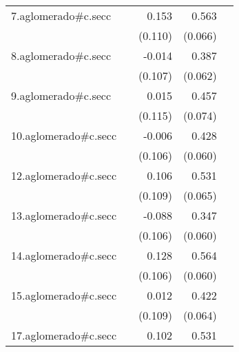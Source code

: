 {\begin{longtable}{l*{4}{D{.}{.}{-1}}}
\addlinespace
7.aglomerado#c.secc&                     &       0.153         &       0.563\sym{***}&                     \\
            &                     &     (0.110)         &     (0.066)         &                     \\
\addlinespace
8.aglomerado#c.secc&                     &      -0.014         &       0.387\sym{***}&                     \\
            &                     &     (0.107)         &     (0.062)         &                     \\
\addlinespace
9.aglomerado#c.secc&                     &       0.015         &       0.457\sym{***}&                     \\
            &                     &     (0.115)         &     (0.074)         &                     \\
\addlinespace
10.aglomerado#c.secc&                     &      -0.006         &       0.428\sym{***}&                     \\
            &                     &     (0.106)         &     (0.060)         &                     \\
\addlinespace
12.aglomerado#c.secc&                     &       0.106         &       0.531\sym{***}&                     \\
            &                     &     (0.109)         &     (0.065)         &                     \\
\addlinespace
13.aglomerado#c.secc&                     &      -0.088         &       0.347\sym{***}&                     \\
            &                     &     (0.106)         &     (0.060)         &                     \\
\addlinespace
14.aglomerado#c.secc&                     &       0.128         &       0.564\sym{***}&                     \\
            &                     &     (0.106)         &     (0.060)         &                     \\
\addlinespace
15.aglomerado#c.secc&                     &       0.012         &       0.422\sym{***}&                     \\
            &                     &     (0.109)         &     (0.064)         &                     \\
\addlinespace
17.aglomerado#c.secc&                     &       0.102         &       0.531\sym{***}&                     \\

\end{longtable}}
